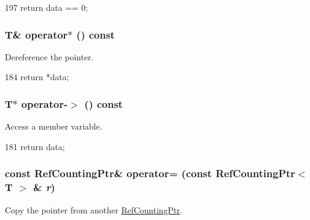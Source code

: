 \begin{DoxyCode}
197 { return data == 0; }
\end{DoxyCode}
\hypertarget{classRefCountingPtr_abcc36ef133f26e7e3145b785df23eb18}{
\subsubsection[{operator$\ast$}]{\setlength{\rightskip}{0pt plus 5cm}T\& operator$\ast$ () const}}
\label{classRefCountingPtr_abcc36ef133f26e7e3145b785df23eb18}


Dereference the pointer. 


\begin{DoxyCode}
184 { return *data; }
\end{DoxyCode}
\hypertarget{classRefCountingPtr_ac0ddd007dfcfef3121f74d0665dfd0cd}{
\subsubsection[{operator-\/$>$}]{\setlength{\rightskip}{0pt plus 5cm}T$\ast$ operator-\/$>$ () const}}
\label{classRefCountingPtr_ac0ddd007dfcfef3121f74d0665dfd0cd}


Access a member variable. 


\begin{DoxyCode}
181 { return data; }
\end{DoxyCode}
\hypertarget{classRefCountingPtr_a5227acb51502321f8d32744c73b9f6e3}{
\subsubsection[{operator=}]{\setlength{\rightskip}{0pt plus 5cm}const {\bf RefCountingPtr}\& operator= (const {\bf RefCountingPtr}$<$ T $>$ \& {\em r})}}
\label{classRefCountingPtr_a5227acb51502321f8d32744c73b9f6e3}


Copy the pointer from another \hyperlink{classRefCountingPtr}{RefCountingPtr}. 


